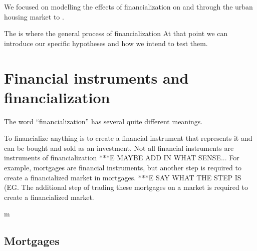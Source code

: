We  focused on modelling the  effects of financialization on and through the urban housing market to . 

The is where the general process of financialization At that point we can introduce our specific hypotheses and how we intend to test them.


\section{Financial instruments and financialization} \label{section-financialize}
The word ``financialization'' has several quite different meanings.  


To financialize anything is to create a  \gls{financial instrument} that represents it and can be bought and sold as an investment. Not all financial instruments are instruments of financialization ***E MAYBE ADD IN WHAT SENSE... %
For example, mortgages are  financial instruments, but another step is required to create a financialized  market in mortgages. ***E SAY WHAT THE STEP IS (EG. The additional step of trading these mortgages on a market is required to create a financialized market. 


m
\subsection{Mortgages}

